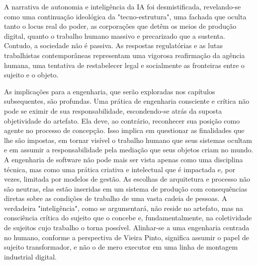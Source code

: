 A narrativa de autonomia e inteligência da IA foi desmistificada, revelando-se como uma continuação ideológica da "tecno-estrutura", uma fachada que oculta tanto o locus real 
do poder, as corporações que detêm os meios de produção digital, quanto o trabalho humano massivo e precarizado que a sustenta. Contudo, a sociedade não é passiva. As 
respostas regulatórias e as lutas trabalhistas contemporâneas representam uma vigorosa reafirmação da agência humana, uma tentativa de restabelecer legal e socialmente as 
fronteiras entre o sujeito e o objeto.

As implicações para a engenharia, que serão exploradas nos capítulos subsequentes, são profundas. Uma prática de engenharia consciente e crítica não pode se eximir de sua 
responsabilidade, escondendo-se atrás da suposta objetividade do artefato. Ela deve, ao contrário, reconhecer sua posição como agente no processo de concepção. Isso implica em 
questionar as finalidades que lhe são impostas, em tornar visível o trabalho humano que seus sistemas ocultam e em assumir a responsabilidade pela mediação que seus objetos 
criam no mundo. A engenharia de software não pode mais ser vista apenas como uma disciplina técnica, mas como uma prática criativa e intelectual que é impactada e, por vezes, 
limitada por modelos de gestão. As escolhas de arquitetura e processo não são neutras, elas estão inseridas em um sistema de produção com consequências diretas sobre as 
condições de trabalho de uma vasta cadeia de pessoas. A verdadeira "inteligência", como se argumentará, não reside no artefato, mas na consciência crítica do sujeito que o 
concebe e, fundamentalmente, na coletividade de sujeitos cujo trabalho o torna possível. Alinhar-se a uma engenharia centrada no humano, conforme a perspectiva de Vieira Pinto, 
significa assumir o papel de sujeito transformador, e não o de mero executor em uma linha de montagem industrial digital.